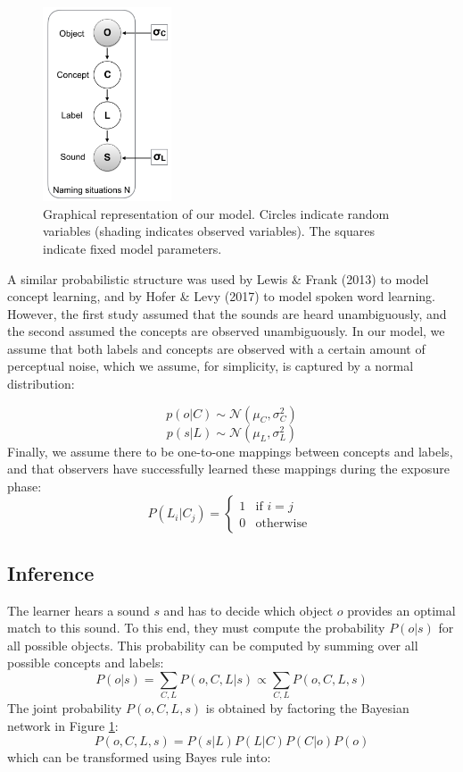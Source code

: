 \documentclass[10pt, letterpaper]{article}
\begin{document}
\begin{figure}
\centering
\includegraphics[width=1.5in]{figs/model.png}
\caption{Graphical representation of our model. Circles indicate random variables (shading indicates observed variables). The squares indicate fixed model parameters.}
\label{fig:model}
\end{figure}

A similar probabilistic structure was used by Lewis \& Frank (2013) to
model concept learning, and by Hofer \& Levy (2017) to model spoken word
learning. However, the first study assumed that the sounds are heard
unambiguously, and the second assumed the concepts are observed
unambiguously. In our model, we assume that both labels and concepts are
observed with a certain amount of perceptual noise, which we assume, for
simplicity, is captured by a normal distribution:

\[ p(o | C) \sim  \mathcal{N}(\mu_C, \sigma^2_C) \]
\[ p(s| L) \sim  \mathcal{N}(\mu_L, \sigma^2_L) \] Finally, we assume
there to be one-to-one mappings between concepts and labels, and that
observers have successfully learned these mappings during the exposure
phase: \[
P(L_i|C_j) = 
\begin{cases}
  1 & \text{if  }  i=j \\  
  0  & \text{otherwise  }
\end{cases}
\]

\subsection{Inference}\label{inference}

The learner hears a sound \(s\) and has to decide which object \(o\)
provides an optimal match to this sound. To this end, they must compute
the probability \(P(o|s)\) for all possible objects. This probability
can be computed by summing over all possible concepts and labels:
\[P(o|s)=\sum_{C,L} P(o, C, L| s) \propto \sum_{C,L} P(o, C, L, s) \]
The joint probability \(P(o, C, L, s)\) is obtained by factoring the
Bayesian network in Figure \ref{fig:model}:
\[P(o,C,L,s) = P(s|L)P(L|C)P(C|o)P(o) \] which can be transformed using
Bayes rule into:
\end{document}
